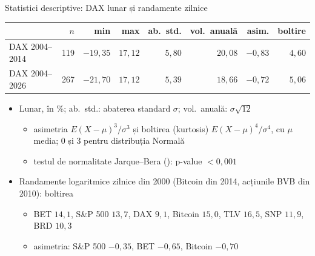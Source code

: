 \begin{frame}{Statistici descriptive: DAX lunar și randamente zilnice}
\itemsize{\footnotesize}
\begin{center}
\footnotesize
\begin{tabular}{lrrrrrrr}
\toprule
& $n$ & min & max & ab.\ std. & vol.\ anuală & asim. & boltire \\
\midrule
DAX 2004--2014 & 119 & $-19{,}35$ & $17{,}12$ & $5{,}80$ & $20{,}08$ & $-0{,}83$ & $4{,}60$ \\
DAX 2004--2026 & 267 & $-21{,}70$ & $17{,}12$ & $5{,}39$ & $18{,}66$ & $-0{,}72$ & $5{,}06$ \\
\bottomrule
\end{tabular}
\end{center}
\begin{itemize}
    \item Lunar, în \%; ab.\ std.: abaterea standard $\sigma$; vol.\ anuală: $\sigma\sqrt{12}$
    \begin{itemize}
        \item asimetria $E(X - \mu)^3/\sigma^3$ și boltirea (kurtosis) $E(X - \mu)^4/\sigma^4$, cu $\mu$ media; 0 și 3 pentru distribuția Normală
        \item testul de normalitate Jarque--Bera (): p-value $<0{,}001$
    \end{itemize}
    \item Randamente logaritmice zilnice din 2000 (Bitcoin din 2014, acțiunile BVB din 2010): boltirea
    \begin{itemize}
        \item BET $14{,}1$, S\&P 500 $13{,}7$, DAX $9{,}1$, Bitcoin $15{,}0$, TLV $16{,}5$, SNP $11{,}9$, BRD $10{,}3$
        \item asimetria: S\&P 500 $-0{,}35$, BET $-0{,}65$, Bitcoin $-0{,}70$
    \end{itemize}
\end{itemize}
\end{frame}


